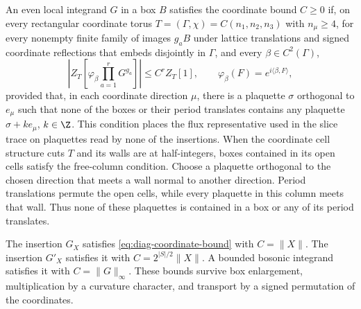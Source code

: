 An even local integrand $G$ in a box $B$ satisfies the coordinate
bound $C\ge0$ if, on every rectangular coordinate torus
$T=(\Gamma,\chi)=C(n_1,n_2,n_3)$ with $n_\mu\ge4$,
for every nonempty finite family of images $g_aB$ under lattice
translations and signed coordinate reflections that embeds
disjointly in $\Gamma$, and every $\beta\in C^2(\Gamma)$,
\begin{equation}\label{eq:diag-coordinate-bound}
 \left|Z_T\left[\varphi_\beta\prod_{a=1}^rG^{g_a}\right]\right|
       \le C^rZ_T[1],\qquad
       \varphi_\beta(F)=e^{i\langle\beta,F\rangle},
\end{equation}
provided that, in each coordinate direction $\mu$, there is a
plaquette $\sigma$ orthogonal to $e_\mu$ such that none of the
boxes or their period translates contains any plaquette
$\sigma+k e_\mu$, $k\in\Z$. This condition places the flux
representative used in the slice trace on plaquettes read by
none of the insertions.
When the coordinate cell structure cuts $T$ and its walls are at
half-integers, boxes contained in its open cells satisfy the
free-column condition. Choose a plaquette orthogonal to the chosen
direction that meets a wall normal to another direction.
Period translations permute the open cells, while every plaquette
in this column meets that wall. Thus none of these plaquettes
is contained in a box or any of its period translates.

\begin{proposition}\label{prop:diag-coordinate-insertions}
The insertion $G_X$ satisfies \eqref{eq:diag-coordinate-bound} with
$C=\|X\|$. The insertion $G'_X$ satisfies it with
$C=2^{|S|/2}\|X\|$. A bounded bosonic integrand satisfies it with
$C=\|G\|_\infty$. These bounds survive box enlargement,
multiplication by a curvature character, and transport by a
signed permutation of the coordinates.
\end{proposition}

